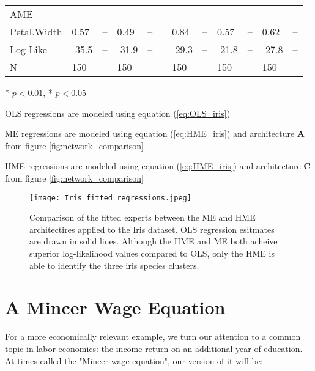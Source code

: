\documentclass[12pt]{article}
\begin{document}
\begin{landscape}
\begin{table}
\begin{threeparttable}
\begin{tabular}[l]{l l l l l l l l l l l l}
  AME \\
  \cmidrule(r){1-1}
  Petal.Width        & 0.57 & --     & 0.49 & --     && 0.84  & --     & 0.57 & --     & 0.62 & --         \\[0.3cm]


  Log-Like           & -35.5 & --    & -31.9 & --    && -29.3  & --    & -21.8& --     & -27.8 & -- \\
  N                  & 150   & --    & 150   & --    && 150    & --    & 150  & --     & 150   & -- \\

	\hline
		\end{tabular}
		\begin{tablenotes}
			\item{\footnotesize ** $p < 0.01$, * $p < 0.05$}
			\item{\footnotesize OLS regressions are modeled using equation (\ref{eq:OLS_iris})}
			\item{\footnotesize ME regressions are modeled using equation (\ref{eq:HME_iris}) and architecture $\boldsymbol{A}$ from figure \ref{fig:network_comparison}}
			\item{\footnotesize HME regressions are modeled using equation (\ref{eq:HME_iris}) and architecture $\boldsymbol{C}$ from figure \ref{fig:network_comparison}}
		\end{tablenotes} \label{tbl:Iris}
	\end{threeparttable}
\end{table}
\end{landscape}


\begin{figure}[!ht]
  \texttt{[image: Iris\_fitted\_regressions.jpeg]}
  \caption{Comparison of the fitted experts between the ME and HME architectires
  applied to the Iris dataset. OLS regression esitmates are drawn in solid lines.
  Although the HME and ME both acheive superior log-likelihood values compared to
  OLS, only the HME is able to identify the three iris species clusters.}
  \label{fig:Iris_fitted_regressions}
\end{figure}


\section{A Mincer Wage Equation} \label{sec:MincerWageEx}

For a more economically relevant example, we turn our attention to a common
topic in labor economics: the income return on an additional year of
education. At times called the "Mincer wage equation", our version of it
will be:
\end{document}
